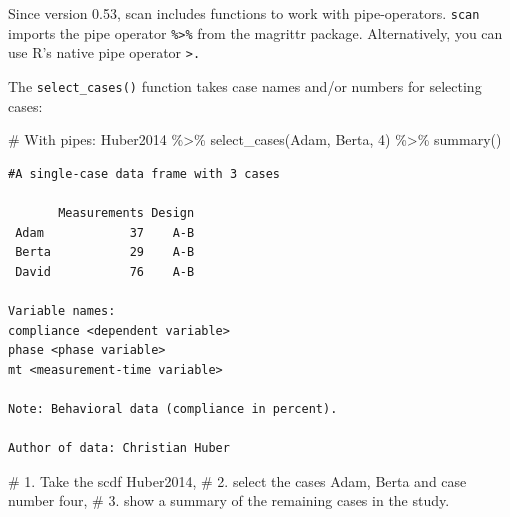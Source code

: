 \documentclass[
  letterpaper,
  DIV=11,
  numbers=noendperiod]{scrreprt}
\newenvironment{Shaded}{\begin{snugshade}}{\end{snugshade}}
\newcommand{\CommentTok}[1]{\textcolor[rgb]{0.37,0.37,0.37}{#1}}
\newcommand{\DecValTok}[1]{\textcolor[rgb]{0.68,0.00,0.00}{#1}}
\newcommand{\FunctionTok}[1]{\textcolor[rgb]{0.28,0.35,0.67}{#1}}
\newcommand{\NormalTok}[1]{\textcolor[rgb]{0.00,0.23,0.31}{#1}}
\newcommand{\SpecialCharTok}[1]{\textcolor[rgb]{0.37,0.37,0.37}{#1}}
\begin{document}
\begin{tcolorbox}[enhanced jigsaw, breakable, toptitle=1mm, colframe=quarto-callout-note-color-frame, arc=.35mm, titlerule=0mm, coltitle=black, rightrule=.15mm, bottomtitle=1mm, bottomrule=.15mm, colbacktitle=quarto-callout-note-color!10!white, title=\textcolor{quarto-callout-note-color}{\faInfo}\hspace{0.5em}{Note}, colback=white, opacitybacktitle=0.6, opacityback=0, leftrule=.75mm, toprule=.15mm, left=2mm]

Since version 0.53, scan includes functions to work with pipe-operators.
\texttt{scan} imports the pipe operator \texttt{\%\textgreater{}\%} from
the magrittr package. Alternatively, you can use R's native pipe
operator \texttt{\textbar{}\textgreater{}.}

\end{tcolorbox}

The \texttt{select\_cases()} function takes case names and/or numbers
for selecting cases:

\begin{Shaded}
\begin{Highlighting}[]
\CommentTok{\# With pipes:}
\NormalTok{Huber2014 }\SpecialCharTok{\%\textgreater{}\%}
  \FunctionTok{select\_cases}\NormalTok{(Adam, Berta, }\DecValTok{4}\NormalTok{) }\SpecialCharTok{\%\textgreater{}\%}
  \FunctionTok{summary}\NormalTok{()}
\end{Highlighting}
\end{Shaded}

\begin{verbatim}
#A single-case data frame with 3 cases

       Measurements Design
 Adam            37    A-B
 Berta           29    A-B
 David           76    A-B

Variable names:
compliance <dependent variable>
phase <phase variable>
mt <measurement-time variable>

Note: Behavioral data (compliance in percent). 

Author of data: Christian Huber 
\end{verbatim}

\begin{Shaded}
\begin{Highlighting}[]
\CommentTok{\# 1. Take the scdf Huber2014,}
\CommentTok{\# 2. select the cases Adam, Berta and case number four,}
\CommentTok{\# 3. show a summary of the remaining cases in the study. }
\end{Highlighting}
\end{Shaded}
\end{document}
